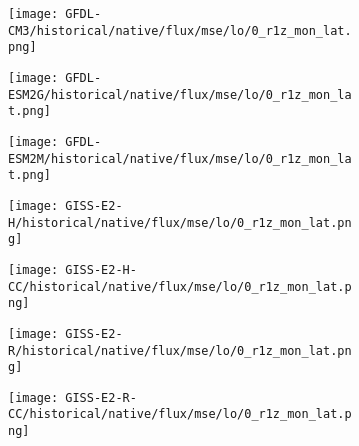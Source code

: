 \documentclass[preview]{standalone}
\begin{document}
\begin{figure}
  \begin{subfigure}[t]{\textwidth}
    \texttt{[image: GFDL-CM3/historical/native/flux/mse/lo/0\_r1z\_mon\_lat.png]}
  \end{subfigure}
\end{figure}

\begin{figure}
  \begin{subfigure}[t]{\textwidth}
    \texttt{[image: GFDL-ESM2G/historical/native/flux/mse/lo/0\_r1z\_mon\_lat.png]}
  \end{subfigure}
\end{figure}

\begin{figure}
  \begin{subfigure}[t]{\textwidth}
    \texttt{[image: GFDL-ESM2M/historical/native/flux/mse/lo/0\_r1z\_mon\_lat.png]}
  \end{subfigure}
\end{figure}

\begin{figure}
  \begin{subfigure}[t]{\textwidth}
    \texttt{[image: GISS-E2-H/historical/native/flux/mse/lo/0\_r1z\_mon\_lat.png]}
  \end{subfigure}
\end{figure}

\begin{figure}
  \begin{subfigure}[t]{\textwidth}
    \texttt{[image: GISS-E2-H-CC/historical/native/flux/mse/lo/0\_r1z\_mon\_lat.png]}
  \end{subfigure}
\end{figure}

\begin{figure}
  \begin{subfigure}[t]{\textwidth}
    \texttt{[image: GISS-E2-R/historical/native/flux/mse/lo/0\_r1z\_mon\_lat.png]}
  \end{subfigure}
\end{figure}

\begin{figure}
  \begin{subfigure}[t]{\textwidth}
    \texttt{[image: GISS-E2-R-CC/historical/native/flux/mse/lo/0\_r1z\_mon\_lat.png]}
  \end{subfigure}
\end{figure}
\end{document}
